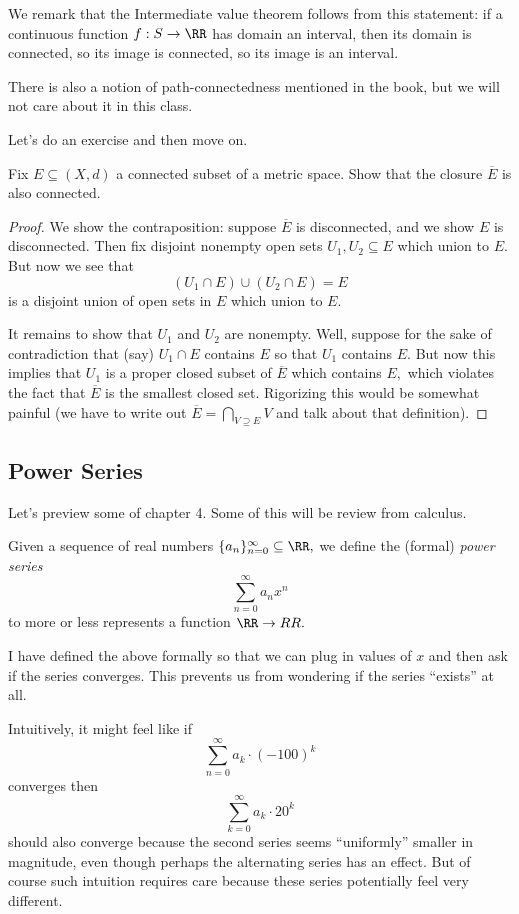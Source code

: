 \documentclass[../notes.tex]{subfiles}
\begin{document}
We remark that the Intermediate value theorem follows from this statement: if a continuous function $f:S\to\RR$ has domain an interval, then its domain is connected, so its image is connected, so its image is an interval.
\begin{remark}
	There is also a notion of path-connectedness mentioned in the book, but we will not care about it in this class.
\end{remark}
Let's do an exercise and then move on.
\begin{exercise}[Ross 22.3]
	Fix $E\subseteq(X,d)$ a connected subset of a metric space. Show that the closure $\overline E$ is also connected.
\end{exercise}
\begin{proof}
	We show the contraposition: suppose $\overline E$ is disconnected, and we show $E$ is disconnected. Then fix disjoint nonempty open sets $U_1,U_2\subseteq E$ which union to $E.$ But now we see that
	\[(U_1\cap E)\cup(U_2\cap E)=E\]
	is a disjoint union of open sets in $E$ which union to $E.$

	It remains to show that $U_1$ and $U_2$ are nonempty. Well, suppose for the sake of contradiction that (say) $U_1\cap E$ contains $E$ so that $U_1$ contains $E.$ But now this implies that $U_1$ is a proper closed subset of $\overline E$ which contains $E,$ which violates the fact that $\overline E$ is the smallest closed set. Rigorizing this would be somewhat painful (we have to write out $\overline E=\bigcap_{V\supseteq E}V$ and talk about that definition).
\end{proof}

\subsection{Power Series}
Let's preview some of chapter 4. Some of this will be review from calculus.
\begin{definition}
	Given a sequence of real numbers $\{a_n\}_{n=0}^\infty\subseteq\RR,$ we define the (formal) \textit{power series}
	\[\sum_{n=0}^\infty a_nx^n\]
	to more or less represents a function $\RR\to\\RR.$
\end{definition}
\begin{remark}
	I have defined the above formally so that we can plug in values of $x$ and then ask if the series converges. This prevents us from wondering if the series ``exists'' at all.
\end{remark}
Intuitively, it might feel like if
\[\sum_{n=0}^\infty a_k\cdot(-100)^k\]
converges then
\[\sum_{k=0}^\infty a_k\cdot20^k\]
should also converge because the second series seems ``uniformly'' smaller in magnitude, even though perhaps the alternating series has an effect. But of course such intuition requires care because these series potentially feel very different.
\end{document}

